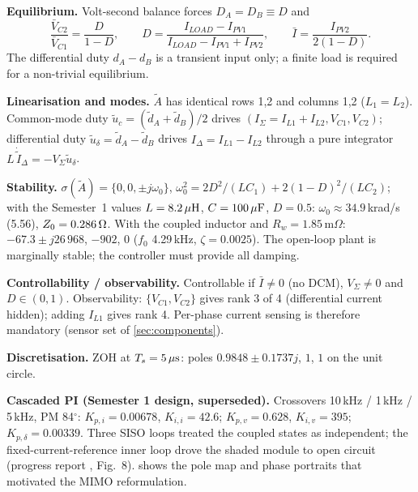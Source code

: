 \textbf{Equilibrium.} Volt-second balance forces $D_A = D_B \equiv D$ and
\begin{equation}
  \frac{\bar V_{C2}}{\bar V_{C1}} = \frac{D}{1-D},\qquad D = \frac{I_{LOAD}-I_{PV1}}{I_{LOAD}-I_{PV1}+I_{PV2}},\qquad \bar I = \frac{I_{PV2}}{2(1-D)}.
\end{equation}
The differential duty $d_A - d_B$ is a transient input only; a finite load is required for a non-trivial equilibrium.

\textbf{Linearisation and modes.} $\tilde A$ has identical rows 1,2 and columns 1,2 ($L_1 = L_2$). Common-mode duty $\tilde u_c = (\tilde d_A+\tilde d_B)/2$ drives $(I_\Sigma = I_{L1}+I_{L2}, V_{C1}, V_{C2})$; differential duty $\tilde u_\delta = \tilde d_A - \tilde d_B$ drives $I_\Delta = I_{L1}-I_{L2}$ through a pure integrator $L\,\dot{\tilde I}_\Delta = -V_\Sigma \tilde u_\delta$.

\textbf{Stability.} $\sigma(\tilde A) = \{0, 0, \pm j\omega_0\}$, $\omega_0^2 = 2D^2/(LC_1) + 2(1-D)^2/(LC_2)$; with the Semester~1 values $L = 8.2\uH$, $C = 100\uF$, $D=0.5$: $\omega_0 \approx 34.9$\,krad/s (5.56\kHz), $Z_0 = 0.286\ohm$. With the coupled inductor and $R_w = 1.85$\,m$\Omega$: $-67.3 \pm j26\,968$, $-902$, $0$ ($f_0$ 4.29\,kHz, $\zeta = 0.0025$). The open-loop plant is marginally stable; the controller must provide all damping.

\textbf{Controllability / observability.} Controllable if $\bar I \ne 0$ (no DCM), $V_\Sigma \ne 0$ and $D \in (0,1)$. Observability: $\{V_{C1},V_{C2}\}$ gives rank 3 of 4 (differential current hidden); adding $I_{L1}$ gives rank 4. Per-phase current sensing is therefore mandatory (sensor set of \cref{sec:components}).

\textbf{Discretisation.} ZOH at $T_s = 5\us$: poles $0.9848 \pm 0.1737j$, $1$, $1$ on the unit circle.

\textbf{Cascaded PI (Semester 1 design, superseded).} Crossovers 10\,kHz / 1\,kHz / 5\,kHz, PM 84$^\circ$: $K_{p,i} = 0.00678$, $K_{i,i} = 42.6$; $K_{p,v} = 0.628$, $K_{i,v} = 395$; $K_{p,\delta} = 0.00339$. Three SISO loops treated the coupled states as independent; the fixed-current-reference inner loop drove the shaded module to open circuit (progress report \cite{saunders_progress_2026}, Fig.~8).  shows the pole map and phase portraits that motivated the MIMO reformulation.


